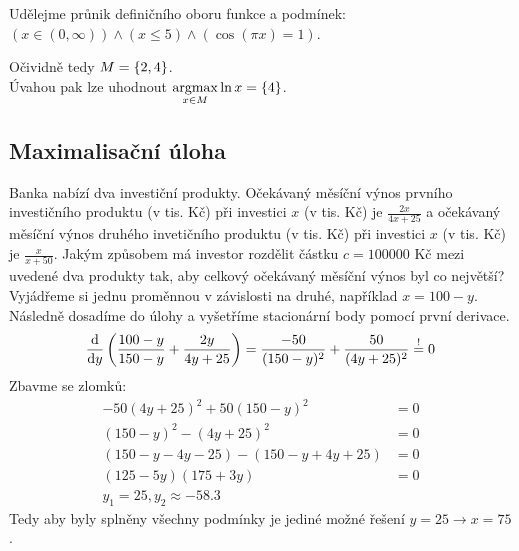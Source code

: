 Udělejme průnik definičního oboru funkce a podmínek: $(x \in (0, \infty)) \land (x \leq 5) \land (\cos(\pi x)=1)$.

\begin{multicols}{2}
  \begin{figure}[H]
    \center
  \end{figure}
\columnbreak
      Očividně tedy $M = \left\lbrace 2,4 \right\rbrace$.\\
      Úvahou pak lze uhodnout $\underset{x \in M}{\operatorname*{argmax}} \ln x = \left\lbrace 4 \right\rbrace$.
\end{multicols}

\subsection{Maximalisační úloha}
Banka nabízí dva investiční produkty. Očekávaný měsíční výnos prvního investičního produktu (v tis. Kč) při investici 
$x$ (v tis. Kč) je $\frac{2x}{4x+25}$ a očekávaný měsíční výnos druhého invetičního produktu (v tis. Kč) při investici 
$x$ (v tis. Kč) je $\frac{x}{x+50}$. Jakým způsobem má investor rozdělit částku $c = 100000$ Kč mezi uvedené dva 
produkty tak, aby celkový očekávaný měsíční výnos byl co největší?
Vyjádřeme si jednu proměnnou v závislosti na druhé, například $x = 100 - y$. Následně dosadíme do úlohy a vyšetříme
stacionární body pomocí první derivace.
\[
    \frac{\mathop{}\!\mathrm{d}}{\mathop{}\!\mathrm{d} y} \left(\frac{100-y}{150-y} + \frac{2y}{4y + 25}\right)= \frac{-50}{(150-y)^2} + \frac{50}{(4y + 25)^2}
    \stackrel{!}{=}0
\]
Zbavme se zlomků:
\begin{align*}
    -50(4y + 25)^2 + 50(150-y)^2 &= 0 \\
    (150-y)^2 - (4y + 25)^2 &= 0 \\
    (150-y -4y - 25) - (150-y + 4y + 25) &=0\\
    (125 - 5y) (175 + 3y) &=0 \\
    y_1 = 25, y_2 \approx -58.3
\end{align*}
Tedy aby byly splněny všechny podmínky je jediné možné řešení $y = 25 \rightarrow x = 75$.

